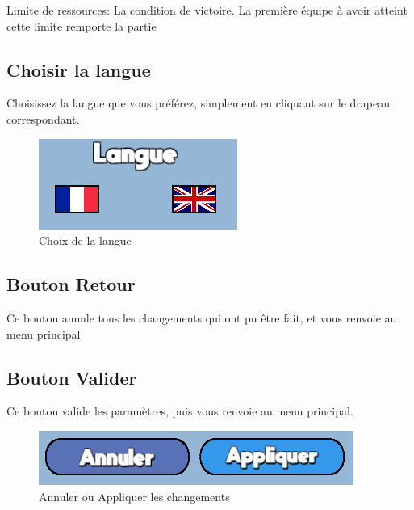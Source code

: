 \documentclass{report}
\begin{document}
Limite de ressources:\newline
La condition de victoire. La première équipe à avoir atteint cette limite remporte la partie

\subsection{Choisir la langue}
Choisissez la langue que vous préférez, simplement en cliquant sur le drapeau correspondant.
\begin{figure}[!h]
	\centering
		\includegraphics[scale=0.80]{Choix_Langue}
	\caption{Choix de la langue}
\end{figure}


\subsection{Bouton Retour}
Ce bouton annule tous les changements qui ont pu être fait, et vous renvoie au menu principal
\subsection{Bouton Valider}
Ce bouton valide les paramètres, puis vous renvoie au menu principal.
\begin{figure}[!h]
	\centering
		\includegraphics[scale=0.80]{ApplyCancelSettings}
	\caption{Annuler ou Appliquer les changements}
\end{figure}
\clearpage
\end{document}
